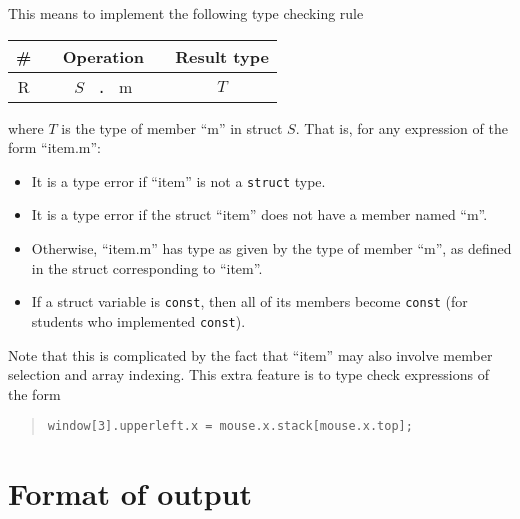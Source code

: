 \documentclass{article}
\newcounter{rule}
\newcommand{\rulenumber}[1]{\refstepcounter{rule}R\therule\label{RULE:#1}}
\begin{document}
This means to implement the following type checking rule
\begin{center}
  \begin{tabular}{cc|c}
    \# & ~ \qquad Operation \qquad ~ & Result type
  \\ \hline
    \rulenumber{members}
    & $S$ ~\verb|.|~ m & $T$
  \end{tabular}
\end{center}
where $T$ is the type of member ``m'' in struct $S$.
That is,
  for any expression of the form ``item.m'':
\begin{itemize}
  \item
  It is a type error if ``item'' is not a {\tt struct} type.

  \item
  It is a type error if the struct ``item''
  does not have a member named ``m''.

  \item
  Otherwise, ``item.m''
  has type as given by the type of member ``m'',
  as defined in the struct corresponding to ``item''.

  \item
  If a struct variable is {\tt const},
    then all of its members become {\tt const}
    (for students who implemented {\tt const}).

\end{itemize}
Note that this is complicated by the fact that ``item''
may also involve member selection and array indexing.
This extra feature is to type check expressions of the form
\begin{quote}
\begin{lstlisting}[numbers=none]
  window[3].upperleft.x = mouse.x.stack[mouse.x.top];
\end{lstlisting}
\end{quote}


\section{Format of output} \label{SEC:output}
\end{document}

